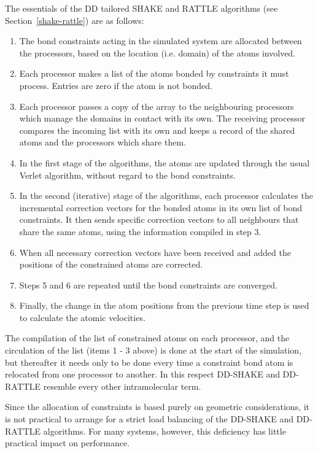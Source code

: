 The essentials of the DD tailored SHAKE and
RATTLE algorithms (see Section~\ref{shake-rattle})
are as follows:
\begin{enumerate}
\item The bond constraints acting in the simulated system are allocated
between the processors, based on the location (i.e. domain) of
the atoms involved.
\item Each processor makes a list of the atoms bonded by
constraints it must process. Entries are zero
if the atom is not bonded.
\item Each processor passes a copy of the array to the neighbouring
processors which manage the domains in contact with its own.
The receiving processor compares the incoming list with its own and
keeps a record of the shared atoms and the processors which share
them.
\item In the first stage of the algorithms, the atoms
are updated through the usual Verlet
algorithm, without regard to the bond
constraints.
\item In the second (iterative) stage of the algorithms, each
processor calculates the incremental correction vectors for the
bonded atoms in its own list of bond
constraints.  It then sends specific correction vectors to all
neighbours that share the same atoms, using the information
compiled in step 3.
\item When all necessary correction vectors have been received and
added the positions of the constrained atoms are corrected.
\item Steps 5 and 6 are repeated until the bond constraints are
converged.
\item Finally, the change in the atom positions from the previous
time step is used to calculate the atomic velocities.
\end{enumerate}

The compilation of the list of constrained atoms on each
processor, and the circulation of the list (items 1 - 3 above) is
done at the start of the simulation, but thereafter it needs only
to be done every time a constraint bond atom is relocated from one
processor to another.  In this respect DD-SHAKE and DD-RATTLE
resemble every other intramolecular term.

Since the allocation of constraints is based purely on geometric
considerations, it is not practical to arrange for a strict load
balancing of the DD-SHAKE and DD-RATTLE algorithms.  For many
systems, however, this deficiency has little practical impact on
performance.

